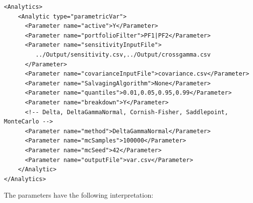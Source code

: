 \begin{listing}[H]
\begin{verbatim}
<Analytics>
    <Analytic type="parametricVar">
      <Parameter name="active">Y</Parameter>
      <Parameter name="portfolioFilter">PF1|PF2</Parameter>
      <Parameter name="sensitivityInputFile">
         ../Output/sensitivity.csv,../Output/crossgamma.csv
      </Parameter>
      <Parameter name="covarianceInputFile">covariance.csv</Parameter>
      <Parameter name="SalvagingAlgorithm">None</Parameter>
      <Parameter name="quantiles">0.01,0.05,0.95,0.99</Parameter>
      <Parameter name="breakdown">Y</Parameter>
      <!-- Delta, DeltaGammaNormal, Cornish-Fisher, Saddlepoint, MonteCarlo -->
      <Parameter name="method">DeltaGammaNormal</Parameter>
      <Parameter name="mcSamples">100000</Parameter>
      <Parameter name="mcSeed">42</Parameter>
      <Parameter name="outputFile">var.csv</Parameter>
    </Analytic>
</Analytics>
\end{verbatim}
\caption{ORE analytic: VaR}
\label{lst:ore_var}
\end{listing}

The parameters have the following interpretation:


